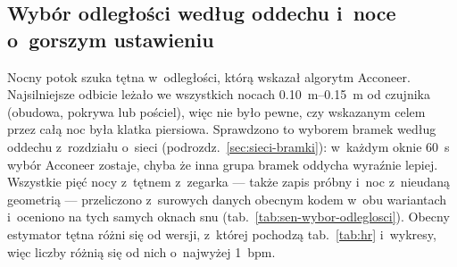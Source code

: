 \documentclass[12pt,a4paper,oneside]{report}
\begin{document}
\subsection{Wybór odległości według oddechu i~noce o~gorszym ustawieniu}
\label{sec:sen-wybor-odleglosci}
Nocny potok szuka tętna w~odległości, którą wskazał algorytm Acconeer. Najsilniejsze odbicie
leżało we wszystkich nocach \SIrange{0.10}{0.15}{m} od czujnika (obudowa, pokrywa lub pościel),
więc nie było pewne, czy wskazanym celem przez całą noc była klatka piersiowa. Sprawdzono to
wyborem bramek według oddechu z~rozdziału o~sieci (podrozdz.~\ref{sec:sieci-bramki}): w~każdym
oknie \SI{60}{s} wybór Acconeer zostaje, chyba że inna grupa bramek oddycha wyraźnie lepiej.
Wszystkie pięć nocy z~tętnem z~zegarka --- także zapis próbny i~noc z~nieudaną geometrią ---
przeliczono z~surowych danych obecnym kodem w~obu wariantach i~oceniono na tych samych oknach snu
(tab.~\ref{tab:sen-wybor-odleglosci}). Obecny estymator tętna różni się od wersji, z~której
pochodzą tab.~\ref{tab:hr} i~wykresy, więc liczby różnią się od nich o~najwyżej \SI{1}{bpm}.

\begin{table}[H]
\centering
\small
\caption{Tętno radaru wobec Garmina w~oknach snu, z~odległością wskazaną przez Acconeer i~wybraną
według oddechu (w~nawiasie odsetek okien, w~których wybór się zmienił). Pokrycie: odsetek okien
snu z~wartością radaru; obciążenie i~MAE dla pojedynczych okien, MAE i~$r$ dla median 10-minutowych.
Częstość oddechu jest w~obu wariantach ta sama (zapisana przez aplikację Acconeer).}
\label{tab:sen-wybor-odleglosci}
\setlength{\tabcolsep}{4pt}
\end{table}
\end{document}
